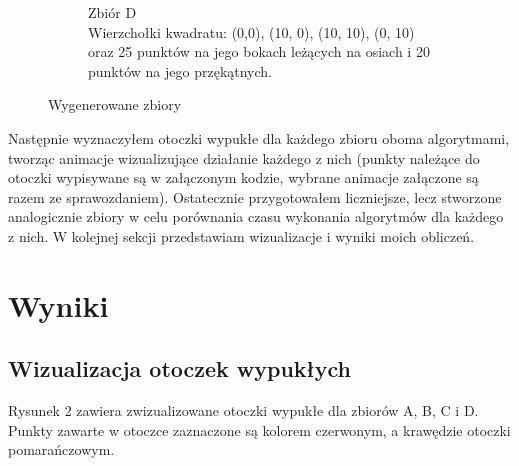 \documentclass[11pt,a4paper]{article}
\begin{document}
\begin{figure}[H]
\begin{subfigure}[b]{0.46\textwidth}
        \caption{
            Zbiór D
            \\
            \footnotesize Wierzchołki kwadratu: (0,0), (10, 0), (10, 10), (0, 10)
            \\
            oraz 25 punktów na jego bokach leżących na osiach
            i 20 punktów na jego przękątnych.
        }
    \end{subfigure}
    \caption{Wygenerowane zbiory}
\end{figure}

Następnie wyznaczyłem otoczki wypukłe dla każdego zbioru oboma
algorytmami, tworząc animacje wizualizujące działanie każdego z nich
(punkty należące do otoczki wypisywane są w załączonym kodzie, 
wybrane animacje załączone są razem ze sprawozdaniem).
Ostatecznie przygotowałem liczniejsze, lecz stworzone analogicznie zbiory
w celu porównania czasu wykonania algorytmów dla każdego z nich.
W kolejnej sekcji przedstawiam wizualizacje i wyniki moich obliczeń.

\section{Wyniki}

\subsection{Wizualizacja otoczek wypukłych}
Rysunek 2 zawiera zwizualizowane otoczki wypukłe dla 
zbiorów A, B, C i D. Punkty zawarte w otoczce zaznaczone
są kolorem czerwonym, a krawędzie otoczki pomarańczowym.
\end{document}
